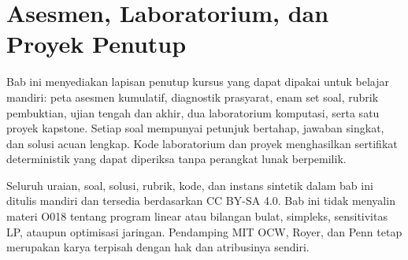 \chapter{Asesmen, Laboratorium, dan Proyek Penutup}
\label{orig03:chapter:course-closure}

Bab ini menyediakan lapisan penutup kursus yang dapat dipakai untuk belajar
mandiri: peta asesmen kumulatif, diagnostik prasyarat, enam set soal, rubrik
pembuktian, ujian tengah dan akhir, dua laboratorium komputasi, serta satu
proyek kapstone. Setiap soal mempunyai petunjuk bertahap, jawaban singkat, dan
solusi acuan lengkap. Kode laboratorium dan proyek menghasilkan sertifikat
deterministik yang dapat diperiksa tanpa perangkat lunak berpemilik.

Seluruh uraian, soal, solusi, rubrik, kode, dan instans sintetik dalam bab ini
ditulis mandiri dan tersedia berdasarkan CC BY-SA 4.0. Bab ini tidak menyalin
materi O018 tentang program linear atau bilangan bulat, simpleks, sensitivitas
LP, ataupun optimisasi jaringan. Pendamping MIT OCW, Royer, dan Penn tetap
merupakan karya terpisah dengan hak dan atribusinya sendiri.















